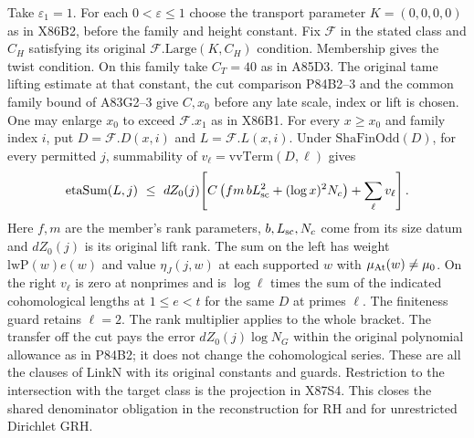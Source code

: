 Take $\varepsilon_1=1$. For each $0<\varepsilon\le1$ choose the
transport parameter $K=(0,0,0,0)$ as in X86B2, before the family
and height constant. Fix $\mathcal F$ in the stated class and
$C_H$ satisfying its original $\mathcal F.\mathrm{Large}(K,C_H)$
condition. Membership gives the twist condition. On this
family take $C_T=40$ as in A85D3. The original tame lifting estimate
at that constant, the cut comparison P84B2--3 and the common
family bound of A83G2--3 give $C,x_0$ before any late scale,
index or lift is chosen. One may enlarge $x_0$ to exceed
$\mathcal F.x_1$ as in X86B1. For every $x\ge x_0$ and family index
$i$, put $D=\mathcal F.D(x,i)$ and $L=\mathcal F.L(x,i)$.
Under $\mathrm{ShaFinOdd}(D)$, for every permitted $j$, summability
of $v_\ell=\mathrm{vvTerm}(D,\ell)$ gives
\[
 \mathrm{etaSum}(L,j)\ \le\ dZ_0(j)\!
 \left[C\left(fm\,b L_{\rm sc}^{2}
                +(\log x)^2 N_c\right)+\sum_\ell v_\ell\right].
\]
Here $f,m$ are the member's rank parameters, $b,L_{\rm sc},N_c$
come from its size datum and $dZ_0(j)$ is its original lift rank.
The sum on the left has weight $\mathrm{lwP}(w)e(w)$ and value
$\eta_J(j,w)$ at each supported $w$ with $\mu_{\rm At}(w)\ne\mu_0$.
On the right $v_\ell$ is zero at nonprimes and is
$\log\ell$ times the sum of the indicated cohomological lengths
at $1\le e<t$ for the same $D$ at primes $\ell$. The finiteness
guard retains $\ell=2$. The rank multiplier applies to the
whole bracket. The transfer off the cut pays the error
$dZ_0(j)\log N_G$ within the original polynomial allowance as
in P84B2; it does not change the cohomological series.
These are all the clauses of $\mathrm{LinkN}$ with its original
constants and guards. Restriction to the intersection with the
target class is the projection in X87S4. This closes the shared
denominator obligation in the reconstruction for RH and for
unrestricted Dirichlet GRH.
